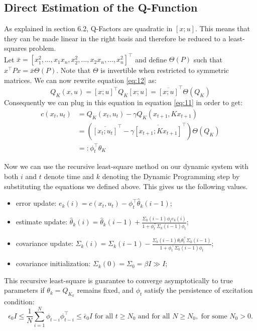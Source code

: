 \documentclass{article}[12pt]
\begin{document}
\subsection{Direct Estimation of the Q-Function}
As explained in section 6.2, Q-Factors are quadratic in $[x;u]$. This means that they can be made linear in the right basis and therefore be reduced to a least-squares problem. \\

Let $\bar{x} = [x_1^2,\dots,x_1x_n,x_2^2,\dots,x_2x_n,\dots,x_n^2]^\top$ and define $\Theta(P)$ such that $x^\top P x = \bar{x} \Theta(P)$. Note that $\Theta$ is invertible when restricted to symmetric matrices. We can now rewrite equation \eqref{eq:12} as:
\begin{equation}\label{eq:16}
    Q_K(x,u)=[x;u]^\top Q_K [x;u] = \overline{[x;u]}^\top \Theta(Q_K)
\end{equation}
Consequently we can plug in this equation in equation \eqref{eq:11} in order to get:
\begin{equation}\label{eq:17}
    \begin{array}{rl}
    c(x_t,u_t) &= Q_K(x_t,u_t)-\gamma Q_K(x_{t+1},Kx_{t+1}) \\
    & = \left(\overline{[x_t;u_t]}^\top-\gamma\overline{[x_{t+1};Kx_{t+1}]}^\top\right) \Theta(Q_K)\\
    & =: \phi_t^\top \theta_K
    \end{array}
\end{equation}

Now we can use the recursive least-square method on our dynamic system with both $i$ and $t$ denote time and $k$ denoting the Dynamic Programming step by substituting the equations we defined above. This gives us the following values.
\begin{itemize}
\item error update: $e_k(i) = c(x_t,u_t) - \phi_t^\top \hat{\theta}_k(i-1)$;
\item estimate update: $\hat{\theta}_k(i) = \hat{\theta}_k(i-1) + \frac{\Sigma_k(i-1)\phi_t e_k(i)}{1+\phi_t^\top \Sigma_k(i-1)\phi_t}$;
\item covariance update: $\Sigma_k(i) = \Sigma_k(i-1) - \frac{\Sigma_k(i-1)\theta_t\theta_t^\top\Sigma_k(i-1)}{1+\phi_t^\top\Sigma_k(i-1)\phi_t}$;
\item covariance initialization: $\Sigma_k(0) = \Sigma_0 = \beta I \gg I$;
\end{itemize}

This recursive least-square is guarantee to converge asymptotically to true parameters if $\theta_k = Q_{K_k}$ remains fixed, and $\phi_t$ satisfy the persistence of excitation condition:
\begin{displaymath}
\epsilon_0 I \leq \frac{1}{N} \sum_{i=1}^N \phi_{t-i}\phi_{t-i}^\top \leq \bar\epsilon_0 I \text{ for all } t \geq N_0 \text{ and for all } N \geq N_0, \text{ for some } N_0>0.
\end{displaymath}
\end{document}
